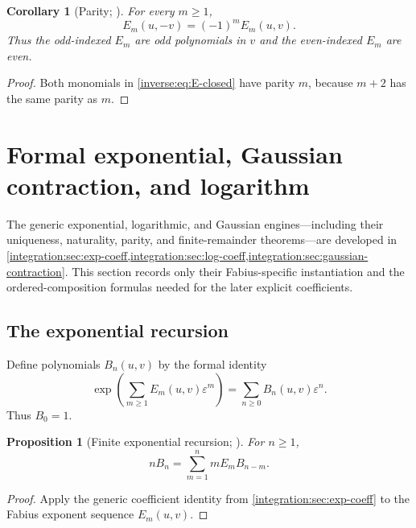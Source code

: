 \documentclass[11pt,oneside]{article}
\newtheorem{proposition}[proposition]{Proposition}
\newtheorem{corollary}[corollary]{Corollary}
\theoremstyle{definition}
\theoremstyle{remark}
\begin{document}
\begin{corollary}[Parity; \Formalized]
\label{inverse:cor:E-parity}
For every $m\geq1$,
\[
 E_m(u,-v)=(-1)^mE_m(u,v).
\]
Thus the odd-indexed $E_m$ are odd polynomials in $v$ and the
even-indexed $E_m$ are even.
\end{corollary}

\begin{proof}
Both monomials in \eqref{inverse:eq:E-closed} have parity $m$, because $m+2$ has
the same parity as $m$.
\end{proof}

\section{Formal exponential, Gaussian contraction, and logarithm}
\label{inverse:sec:coefficient-formulas}

The generic exponential, logarithmic, and Gaussian engines---including their uniqueness,
naturality, parity, and finite-remainder theorems---are developed in
\cref{integration:sec:exp-coeff,integration:sec:log-coeff,integration:sec:gaussian-contraction}.
This section records only their Fabius-specific instantiation and the ordered-composition
formulas needed for the later explicit coefficients.

\subsection{The exponential recursion}

Define polynomials $B_n(u,v)$ by the formal identity
\begin{equation}
 \exp\!\left(\sum_{m\geq1}E_m(u,v)\varepsilon^m\right)
 =\sum_{n\geq0}B_n(u,v)\varepsilon^n.
 \label{inverse:eq:B-definition}
\end{equation}
Thus $B_0=1$.

\begin{proposition}[Finite exponential recursion; \Formalized]
\label{inverse:prop:exp-recursion}
For $n\geq1$,
\begin{equation}
 nB_n=\sum_{m=1}^n mE_mB_{n-m}. \label{inverse:eq:B-recursion}
\end{equation}
\end{proposition}

\begin{proof}
Apply the generic coefficient identity from \cref{integration:sec:exp-coeff} to the
Fabius exponent sequence \(E_m(u,v)\).
\end{proof}
\end{document}
